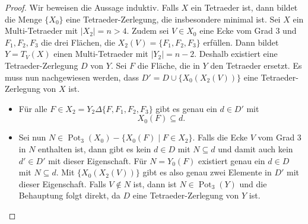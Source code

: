 \documentclass[12pt,titlepage,twoside,cleardoublepage]{article}
\theoremstyle{nummermitklammern}
\numberwithin{equation}{section}
\DeclareMathOperator{\Pot}{Pot}
\begin{document}
\begin{proof}
Wir beweisen die Aussage induktiv. Falls $X$ ein Tetraeder ist, dann bildet die Menge $\{X_0\}$ eine Tetraeder-Zerlegung, die insbesondere minimal ist.
Sei $X$ ein Multi-Tetraeder mit $\vert X_2\vert =n > 4.$ Zudem sei $V\in X_0$ eine Ecke vom Grad 3 und $F_1,F_2,F_3$ die drei Flächen, die $X_2(V)=\{F_1,F_2,F_3\}$ erfüllen.  Dann bildet $Y=T_V(X)$ einen Multi-Tetraeder mit $\vert Y_2 \vert =n-2.$ Deshalb existiert eine Tetraeder-Zerlegung $D$ von $Y.$ Sei $F$ die Fläche, die in $Y$ den Tetraeder ersetzt. Es muss nun nachgewiesen werden, dass $D'=D\cup \{X_0(X_2(V))\}$ eine Tetraeder-Zerlegung von $X$ ist.
\begin{itemize}
\item Für alle $F\in X_2= Y_2 \Delta\{F,F_1,F_2,F_3\}$ gibt es genau ein $d\in D'$ mit 
\[
X_0(F)\subseteq d.
\] 
\item Sei nun $N\in \Pot_3(X_0)-\{X_0(F)\mid F\in X_2\}.$ Falls die Ecke $V$ vom Grad 3 in $N$ enthalten ist, 
dann gibt es kein $d\in D$ mit $N\subseteq d$ und damit auch kein $d'\in D'$ mit dieser Eigenschaft. Für $N=Y_0(F)$ existiert genau ein $d \in D$ mit $N\subseteq d.$ Mit $\{X_0(X_2(V))\}$ gibt es also genau zwei Elemente in $D'$ mit dieser Eigenschaft. Falls $V\notin N$ ist, dann ist $N\in \Pot_3(Y)$ und die Behauptung folgt direkt, da $D$ eine Tetraeder-Zerlegung von $Y$ ist.
\end{itemize}
\end{proof}
\end{document}
